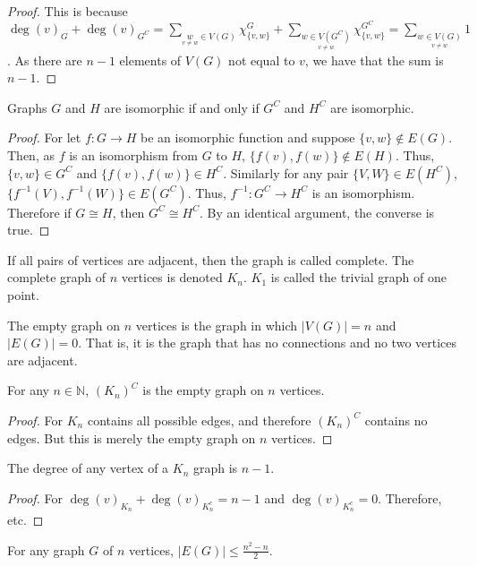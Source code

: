 \documentclass[crop=false,class=book,oneside]{standalone}
\begin{document}
\begin{proof}
This is because $\deg(v)_G+\deg(v)_{G^C} = \sum_{\underset{v\ne w}w\in V(G)}\chi_{\{v,w\}}^G + \sum_{\underset{v\ne w}{w\in V(G^C)}}\chi_{\{v,w\}}^{G^C} = \sum_{\underset{v\ne w}{w\in V(G)}} 1$. As there are $n-1$ elements of $V(G)$ not equal to $v$, we have that the sum is $n-1$.
\end{proof}
\begin{theorem}
Graphs $G$ and $H$ are isomorphic if and only if $G^C$ and $H^C$ are isomorphic.
\end{theorem}
\begin{proof}
For let $f:G\rightarrow H$ be an isomorphic function and suppose $\{v,w\}\notin E(G)$. Then, as $f$ is an isomorphism from $G$ to $H$, $\{f(v),f(w)\}\notin E(H)$. Thus, $\{v,w\}\in G^C$ and $\{f(v),f(w)\}\in H^C$. Similarly for any pair $\{V,W\}\in E(H^C)$, $\{f^{-1}(V),f^{-1}(W)\} \in E(G^C)$. Thus, $f^{-1}:G^C \rightarrow H^C$ is an isomorphism. Therefore if $G\cong H$, then $G^C \cong H^C$. By an identical argument, the converse is true.
\end{proof}
\begin{definition}
If all pairs of vertices are adjacent, then the graph is called complete. The complete graph of $n$ vertices is denoted $K_n$. $K_1$ is called the trivial graph of one point.
\end{definition}
\begin{definition}
The empty graph on $n$ vertices is the graph in which $|V(G)| = n$ and $|E(G)| = 0$. That is, it is the graph that has no connections and no two vertices are adjacent.
\end{definition}
\begin{corollary}
For any $n\in \mathbb{N}$, $(K_n)^C$ is the empty graph on $n$ vertices.
\end{corollary}
\begin{proof}
For $K_n$ contains all possible edges, and therefore $(K_n)^C$ contains no edges. But this is merely the empty graph on $n$ vertices.
\end{proof}
\begin{corollary}
The degree of any vertex of a $K_n$ graph is $n-1$.
\end{corollary}
\begin{proof}
For $\deg(v)_{K_n} + \deg(v)_{K_n^c}=n-1$ and $\deg(v)_{K_n^c} = 0$. Therefore, etc.
\end{proof}
\begin{corollary}
For any graph $G$ of $n$ vertices, $|E(G)|\leq \frac{n^2-n}{2}$.
\end{corollary}
\end{document}
